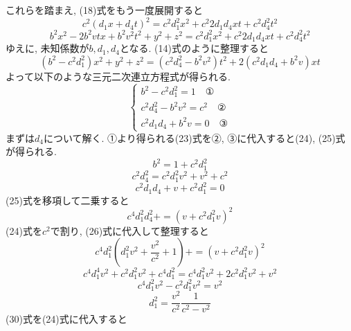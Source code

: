 \documentclass{ltjsarticle}
\begin{document}
これらを踏まえ, (18)式をもう一度展開すると
\begin{equation}
  c^2(d_1 x + d_4 t)^2 = c^2 d_1^2 x^2 + c^2 2 d_1d_4 xt + c^2 d_4^2 t^2
\end{equation}
\begin{equation}
  b^2 x^2 -2b^2 vtx + b^2 v^2 t^2 + y^2 +z^2 = c^2 d_1^2 x^2 + c^2 2 d_1d_4 xt + c^2 d_4^2 t^2
\end{equation}
ゆえに, 未知係数が$b, d_1, d_4$となる. (14)式のように整理すると
\begin{equation}
  (b^2 - c^2 d_1^2)x^2 + y^2+ z^2 = (c^2 d_4^2 - b^2 v^2)t^2 +2(c^2 d_1 d_4 + b^2 v)xt
\end{equation}
よって以下のような三元二次連立方程式が得られる. 
\begin{equation}
\begin{cases}
b^2 - c^2 d_1^2 = 1 \quad ①\\
c^2 d_4^2 - b^2 v^2 = c^2 \quad ②\\
c^2 d_1 d_4 + b^2 v = 0 \quad ③
\end{cases}
\end{equation}
まずは$d_4$について解く. ①より得られる(23)式を②, ③に代入すると(24), (25)式が得られる. 
\begin{equation}
  b^2 = 1 + c^2 d_1^2
\end{equation}
\begin{equation}
  c^2 d_4^2 =  c^2 d_1^2 v^2 + v^2 + c^2
\end{equation}
\begin{equation}
  c^2 d_1 d_4 + v + c^2 d_1^2= 0 
\end{equation}
(25)式を移項して二乗すると
\begin{equation}
  c^4 d_1^2 d_4^2 +  = (v + c^2 d_1^2v)^2
\end{equation}
(24)式を$c^2$で割り, (26)式に代入して整理すると
\begin{equation}
  c^4 d_1^2 (d_1^2 v^2 + \frac{v^2}{c^2} + 1) +  = (v + c^2 d_1^2v)^2
\end{equation}
\begin{equation}
  c^4 d_1^4 v^2 + c^2 d_1^2 v^2 + c^4d_1^2 = c^4 d_1^2 v^2 + 2c^2 d_1^2 v^2 + v^2
\end{equation}
\begin{equation}
  c^4 d_1^2 v^2 - c^2 d_1^2 v^2 = v^2
\end{equation}
\begin{equation}
  d_1^2 = \frac{v^2}{c^2} \frac{1}{c^2 - v^2}
\end{equation}
(30)式を(24)式に代入すると
\end{document}
